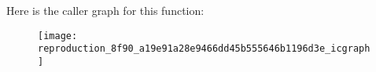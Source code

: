 Here is the caller graph for this function\+:\nopagebreak
\begin{figure}[H]
\begin{center}
\leavevmode
\texttt{[image: reproduction\_8f90\_a19e91a28e9466dd45b555646b1196d3e\_icgraph]}
\end{center}
\end{figure}


